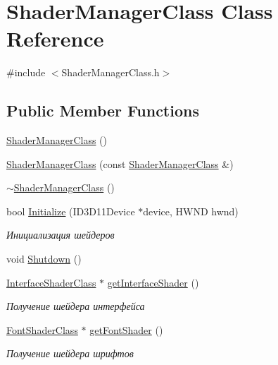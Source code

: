 \hypertarget{class_shader_manager_class}{}\section{Shader\+Manager\+Class Class Reference}
\label{class_shader_manager_class}


{\ttfamily \#include $<$Shader\+Manager\+Class.\+h$>$}

\subsection*{Public Member Functions}
\begin{DoxyCompactItemize}
\item 
\hyperlink{class_shader_manager_class_acb6e9ab51bb5d93fa8222f1b730a00fe}{Shader\+Manager\+Class} ()
\item 
\hyperlink{class_shader_manager_class_a71f470bada728d753c28714d2d1f9dad}{Shader\+Manager\+Class} (const \hyperlink{class_shader_manager_class}{Shader\+Manager\+Class} \&)
\item 
\hyperlink{class_shader_manager_class_ad121e57c890728aa1107f9ef0626bd0c}{$\sim$\+Shader\+Manager\+Class} ()
\item 
bool \hyperlink{class_shader_manager_class_aec1aeb72bc846bee4eb67aa90dec262a}{Initialize} (I\+D3\+D11\+Device $\ast$device, H\+W\+ND hwnd)
\begin{DoxyCompactList}\small\item\em Инициализация шейдеров \end{DoxyCompactList}\item 
void \hyperlink{class_shader_manager_class_a00c7397a84cf7055c3b655d92677eba2}{Shutdown} ()
\item 
\hyperlink{class_interface_shader_class}{Interface\+Shader\+Class} $\ast$ \hyperlink{class_shader_manager_class_a25f673a421424fa463ce8ccfba96467c}{get\+Interface\+Shader} ()
\begin{DoxyCompactList}\small\item\em Получение шейдера интерфейса \end{DoxyCompactList}\item 
\hyperlink{class_font_shader_class}{Font\+Shader\+Class} $\ast$ \hyperlink{class_shader_manager_class_a47b797b06bf218ce516a74ab4e638a11}{get\+Font\+Shader} ()
\begin{DoxyCompactList}\small\item\em Получение шейдера шрифтов \end{DoxyCompactList}\item 

\end{DoxyCompactItemize}
